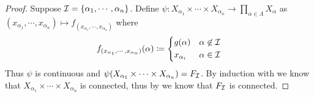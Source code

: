\documentclass[screen]{techreport}
\numberwithin{equation}{section}
\begin{document}
\begin{proof}
	Suppose $\mathcal{I} = \{ \alpha_1,\cdots,\alpha_n\}$.
	Define $\psi : X_{\alpha_1} \times \cdots \times X_{\alpha_n} \to \prod_{\alpha \in \Lambda} X_\alpha$ as $(x_{\alpha_1},\cdots,x_{\alpha_n}) \mapsto f_{(x_{\alpha_1},\cdots,x_{\alpha_n})}$ where
	\[
	f_{(x_{\alpha_1},\cdots,x_{\alpha_n})}(\alpha) \coloneqq \begin{dcases}
 		g(\alpha) & \alpha \not\in \mathcal{I} \\
 		x_{\alpha_i} & \alpha \in \mathcal{I}
 	\end{dcases}
	\]
	Thus $\psi$ is continuous and $\psi(X_{\alpha_1} \times \cdots \times X_{\alpha_n}) = F_{\mathcal{I}}$.
	By induction with  we know that $X_{\alpha_1} \times \cdots \times X_{\alpha_n}$ is connected, thus by  we know that $F_{\mathcal{I}}$ is connected.
\end{proof}
\end{document}
